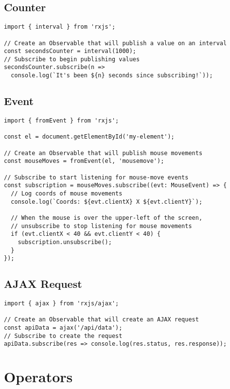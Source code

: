 \subsection{Counter}
\begin{lstlisting}
import { interval } from 'rxjs';

// Create an Observable that will publish a value on an interval
const secondsCounter = interval(1000);
// Subscribe to begin publishing values
secondsCounter.subscribe(n =>
  console.log(`It's been ${n} seconds since subscribing!`));
\end{lstlisting}

\subsection{Event}

\begin{lstlisting}
import { fromEvent } from 'rxjs';

const el = document.getElementById('my-element');

// Create an Observable that will publish mouse movements
const mouseMoves = fromEvent(el, 'mousemove');

// Subscribe to start listening for mouse-move events
const subscription = mouseMoves.subscribe((evt: MouseEvent) => {
  // Log coords of mouse movements
  console.log(`Coords: ${evt.clientX} X ${evt.clientY}`);

  // When the mouse is over the upper-left of the screen,
  // unsubscribe to stop listening for mouse movements
  if (evt.clientX < 40 && evt.clientY < 40) {
    subscription.unsubscribe();
  }
});
\end{lstlisting}

\subsection{AJAX Request}
\begin{lstlisting}
import { ajax } from 'rxjs/ajax';

// Create an Observable that will create an AJAX request
const apiData = ajax('/api/data');
// Subscribe to create the request
apiData.subscribe(res => console.log(res.status, res.response));
\end{lstlisting}

\section{Operators}

